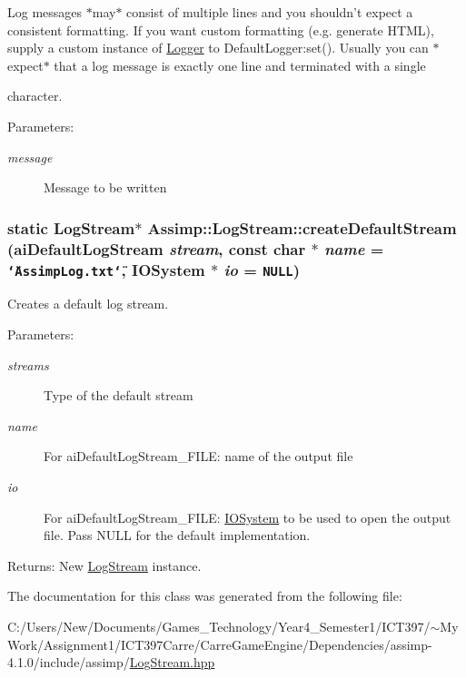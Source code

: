 Log messages $\ast$may$\ast$ consist of multiple lines and you shouldn't expect a consistent formatting. If you want custom formatting (e.g. generate HTML), supply a custom instance of \hyperlink{class_assimp_1_1_logger}{Logger} to DefaultLogger:set(). Usually you can $\ast$expect$\ast$ that a log message is exactly one line and terminated with a single \par
 character. \begin{Desc}
\item[Parameters:]
\begin{description}
\item[{\em message}]Message to be written \end{description}
\end{Desc}
\hypertarget{class_assimp_1_1_log_stream_6b358a4a79b2e9ba2025e10d3e9405e3}{
\subsubsection[createDefaultStream]{\setlength{\rightskip}{0pt plus 5cm}static {\bf LogStream}$\ast$ Assimp::LogStream::createDefaultStream ({\bf aiDefaultLogStream} {\em stream}, \/  const char $\ast$ {\em name} = {\tt \char`\"{}AssimpLog.txt\char`\"{}}, \/  {\bf IOSystem} $\ast$ {\em io} = {\tt NULL})}}
\label{class_assimp_1_1_log_stream_6b358a4a79b2e9ba2025e10d3e9405e3}


Creates a default log stream. 

\begin{Desc}
\item[Parameters:]
\begin{description}
\item[{\em streams}]Type of the default stream \item[{\em name}]For aiDefaultLogStream\_\-FILE: name of the output file \item[{\em io}]For aiDefaultLogStream\_\-FILE: \hyperlink{class_assimp_1_1_i_o_system}{IOSystem} to be used to open the output file. Pass NULL for the default implementation. \end{description}
\end{Desc}
\begin{Desc}
\item[Returns:]New \hyperlink{class_assimp_1_1_log_stream}{LogStream} instance. \end{Desc}


The documentation for this class was generated from the following file:\begin{CompactItemize}
\item 
C:/Users/New/Documents/Games\_\-Technology/Year4\_\-Semester1/ICT397/$\sim$My Work/Assignment1/ICT397Carre/CarreGameEngine/Dependencies/assimp-4.1.0/include/assimp/\hyperlink{_log_stream_8hpp}{LogStream.hpp}\end{CompactItemize}
